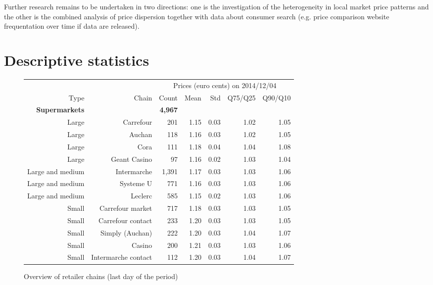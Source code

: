 \documentclass[english]{article}
\begin{document}
Further research remains to be undertaken in two directions: one is the investigation of the heterogeneity in local market price patterns and the other is the combined analysis of price dispersion together with data about consumer search (e.g. price comparison website frequentation over time if data are released).

\newpage



\newpage

\appendix

\section{Descriptive statistics}

\begin{figure}[!h]
  \caption{Overview of retailer chains (last day of the period)}
    \begin{tabular}{rrrrrrr}
    \hline
		\hline
          &       & \multicolumn{5}{c}{Prices (euro cents) on 2014/12/04} \\
    Type  & Chain & Count & Mean  & Std   & Q75/Q25 & Q90/Q10 \\
		\hline
    \textbf{Supermarkets} &       & \textbf{4,967} &       &       &       &  \\
    Large & Carrefour & 201   & 1.15  & 0.03  & 1.02  & 1.05 \\
    Large & Auchan & 118   & 1.16  & 0.03  & 1.02  & 1.05 \\
    Large & Cora  & 111   & 1.18  & 0.04  & 1.04  & 1.08 \\
    Large & Geant Casino & 97    & 1.16  & 0.02  & 1.03  & 1.04 \\
    Large and medium & Intermarche & 1,391 & 1.17  & 0.03  & 1.03  & 1.06 \\
    Large and medium & Systeme U & 771   & 1.16  & 0.03  & 1.03  & 1.06 \\
    Large and medium & Leclerc & 585   & 1.15  & 0.02  & 1.03  & 1.06 \\
    Small & Carrefour market & 717   & 1.18  & 0.03  & 1.03  & 1.05 \\
    Small & Carrefour contact & 233   & 1.20  & 0.03  & 1.03  & 1.05 \\
    Small & Simply (Auchan) & 222   & 1.20  & 0.03  & 1.04  & 1.07 \\
    Small & Casino & 200   & 1.21  & 0.03  & 1.03  & 1.06 \\
    Small & Intermarche contact & 112   & 1.20  & 0.03  & 1.04  & 1.07 \\

\end{tabular}
\end{figure}
\end{document}
